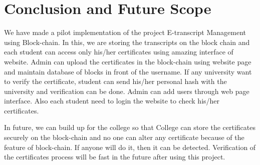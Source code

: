 \clearpage
\section{Conclusion and Future Scope}
We have made a pilot implementation of the project E-transcript Management using Block-chain. In this, we are storing the transcripts on the block chain and each student can access only his/her certificates using amazing interface of website. Admin can upload the certificates in the block-chain using website page and maintain database of blocks in front of the username. If any university want to verify the certificate, student can send his/her personal hash with the university and verification can be done. Admin can add users through web page interface. Also each student need to login the website to check his/her certificates.

In future, we can build up for the college so that College can store the certificates securely on the block-chain and no one can alter any certificate because of the feature of block-chain. If anyone will do it, then it can be detected.  Verification of the certificates process will be fast in the future after using this project.